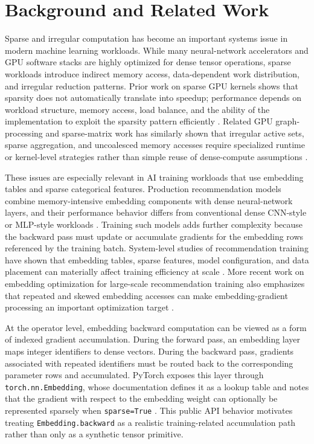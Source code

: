 \section{Background and Related Work}
\label{sec:background-related-work}

Sparse and irregular computation has become an important systems issue in modern machine learning workloads. While many neural-network accelerators and GPU software stacks are highly optimized for dense tensor operations, sparse workloads introduce indirect memory access, data-dependent work distribution, and irregular reduction patterns. Prior work on sparse GPU kernels shows that sparsity does not automatically translate into speedup; performance depends on workload structure, memory access, load balance, and the ability of the implementation to exploit the sparsity pattern efficiently \cite{gale2020sparse}. Related GPU graph-processing and sparse-matrix work has similarly shown that irregular active sets, sparse aggregation, and uncoalesced memory accesses require specialized runtime or kernel-level strategies rather than simple reuse of dense-compute assumptions \cite{wang2016gunrock,huang2020gespmm}.

These issues are especially relevant in AI training workloads that use embedding tables and sparse categorical features. Production recommendation models combine memory-intensive embedding components with dense neural-network layers, and their performance behavior differs from conventional dense CNN-style or MLP-style workloads \cite{gupta2020architectural}. Training such models adds further complexity because the backward pass must update or accumulate gradients for the embedding rows referenced by the training batch. System-level studies of recommendation training have shown that embedding tables, sparse features, model configuration, and data placement can materially affect training efficiency at scale \cite{acun2021training}. More recent work on embedding optimization for large-scale recommendation training also emphasizes that repeated and skewed embedding accesses can make embedding-gradient processing an important optimization target \cite{liu2024embark}.

At the operator level, embedding backward computation can be viewed as a form of indexed gradient accumulation. During the forward pass, an embedding layer maps integer identifiers to dense vectors. During the backward pass, gradients associated with repeated identifiers must be routed back to the corresponding parameter rows and accumulated. PyTorch exposes this layer through \texttt{torch.nn.Embedding}, whose documentation defines it as a lookup table and notes that the gradient with respect to the embedding weight can optionally be represented sparsely when \texttt{sparse=True} \cite{pytorchStableEmbedding}. This public API behavior motivates treating \texttt{Embedding.backward} as a realistic training-related accumulation path rather than only as a synthetic tensor primitive.

